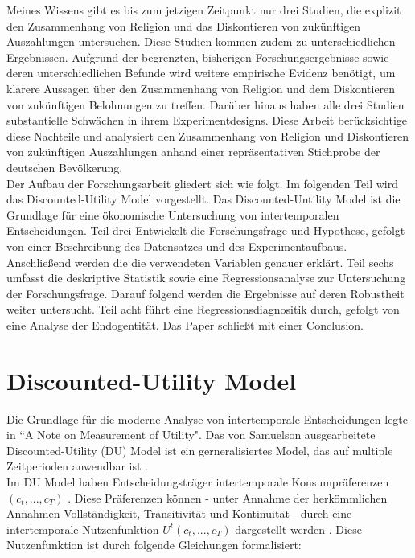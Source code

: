 \documentclass[11pt,a4paper]{article}
\begin{document}
Meines Wissens gibt es bis zum jetzigen Zeitpunkt nur drei Studien, die explizit den Zusammenhang von Religion und das Diskontieren von zukünftigen Auszahlungen untersuchen. Diese Studien kommen zudem zu unterschiedlichen Ergebnissen. Aufgrund der begrenzten, bisherigen Forschungsergebnisse sowie deren unterschiedlichen Befunde wird weitere empirische Evidenz benötigt, um klarere Aussagen über den  Zusammenhang von Religion und dem Diskontieren von zukünftigen Belohnungen zu treffen. Darüber hinaus haben alle drei Studien substantielle Schwächen in ihrem Experimentdesigns. Diese Arbeit berücksichtige diese Nachteile und analysiert den Zusammenhang von Religion und Diskontieren von zukünftigen Auszahlungen anhand einer repräsentativen Stichprobe der deutschen Bevölkerung.\\ 
 
Der Aufbau der Forschungsarbeit gliedert sich wie folgt. Im folgenden Teil wird das Discounted-Utility Model vorgestellt. Das Discounted-Untility Model ist die Grundlage für eine ökonomische Untersuchung von intertemporalen Entscheidungen. Teil drei Entwickelt die Forschungsfrage und Hypothese, gefolgt von einer Beschreibung des Datensatzes und des Experimentaufbaus. Anschließend werden die die verwendeten Variablen genauer erklärt. Teil sechs umfasst die deskriptive Statistik sowie eine Regressionsanalyse zur Untersuchung der Forschungsfrage. Darauf folgend werden die Ergebnisse auf deren Robustheit weiter untersucht. Teil acht führt eine Regressionsdiagnositik durch, gefolgt von eine Analyse der Endogentität. Das Paper schließt mit einer Conclusion. 


\section{Discounted-Utility Model}
Die Grundlage für die moderne Analyse von intertemporale Entscheidungen legte \textcite{samuelson1937note} in “A Note on Measurement of Utility". Das von Samuelson ausgearbeitete Discounted-Utility (DU) Model ist ein gerneralisiertes Model, das auf multiple Zeitperioden anwendbar ist \parencite{frederick2002time}.\\

Im DU Model haben Entscheidungsträger intertemporale Konsumpräferenzen $(c_t,...,c_T)$ \parencite{frederick2002time}. Diese Präferenzen können - unter Annahme der herkömmlichen Annahmen Vollständigkeit, Transitivität und Kontinuität -  durch eine intertemporale Nutzenfunktion $U^{t}(c_{t},...,c_{T}) $ dargestellt werden \parencite{frederick2002time}. Diese Nutzenfunktion ist durch folgende Gleichungen formalisiert: 
\end{document}
